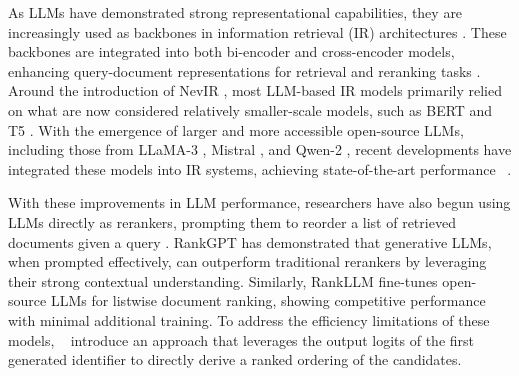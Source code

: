 As LLMs have demonstrated strong representational capabilities, they are increasingly used as backbones in information retrieval (IR) architectures \cite{zhularge}. These backbones are integrated into both bi-encoder and cross-encoder models, enhancing query-document representations for retrieval and reranking tasks \cite{zhularge}. Around the introduction of NevIR \cite{weller2024nevirnegationneuralinformation}, most LLM-based IR models primarily relied on what are now considered relatively smaller-scale models, such as BERT \cite{BERT} and T5 \cite{T5}. With the emergence of larger and more accessible open-source LLMs, including those from LLaMA-3 \cite{llama3}, Mistral \cite{mistral7b}, and Qwen-2 \cite{yang2024qwen2technicalreport}, recent developments have integrated these models into IR systems, achieving state-of-the-art performance ~\cite{promptriever, repllama_rankllama, qwen_gte, gritlm}.

With these improvements in LLM performance, researchers have also begun using LLMs directly as rerankers, prompting them to reorder a list of retrieved documents given a query \cite{rankGPT, rankLLM}. RankGPT \cite{rankGPT} has demonstrated that generative LLMs, when prompted effectively, can outperform traditional rerankers by leveraging their strong contextual understanding. Similarly, RankLLM \cite{rankLLM} fine-tunes open-source LLMs for listwise document ranking, showing competitive performance with minimal additional training. To address the efficiency limitations of these models, ~\citet{FIRST}  introduce an approach that leverages the output logits of the first generated identifier to directly derive a ranked ordering of the candidates.
